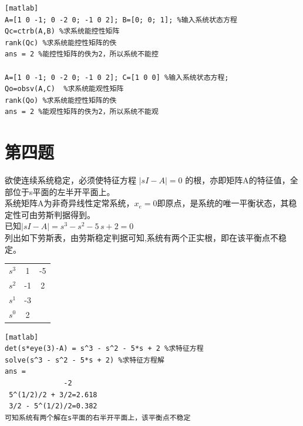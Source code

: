 \documentclass[a4paper]{article}
\begin{document}
\begin{verbatim}[matlab]
A=[1 0 -1; 0 -2 0; -1 0 2]; B=[0; 0; 1]; %输入系统状态方程
Qc=ctrb(A,B) %求系统能控性矩阵
rank(Qc) %求系统能控性矩阵的佚
ans = 2 %能控性矩阵的佚为2，所以系统不能控
 
A=[1 0 -1; 0 -2 0; -1 0 2]; C=[1 0 0] %输入系统状态方程;   
Qo=obsv(A,C)  %求系统能观性矩阵
rank(Qo) %求系统能控性矩阵的佚
ans = 2 %能观性矩阵的佚为2，所以系统不能观
\end{verbatim}
\section*{第四题}
欲使连续系统稳定，必须使特征方程 $|sI-A|=0$ 的根，亦即矩阵A的特征值，全部位于s平面的左半开平面上。\\
系统矩阵A为非奇异线性定常系统，$x_{e}=0$即原点，是系统的唯一平衡状态，其稳定性可由劳斯判据得到。\\
已知$|sI-A|=s^3 - s^2 - 5\, s + 2 =0 $ \\
列出如下劳斯表，由劳斯稳定判据可知,系统有两个正实根，即在该平衡点不稳定。
\begin{table}[!h]
\centering
\begin{tabular}{c  c  c}  
$s^{3}$ & 1 & -5 \\ 
$s^{2}$ & -1 & 2 \\ 
$s^{1}$ & -3 & \\ 
$s^{0}$ & 2 & 
\end{tabular}
\end{table}

\begin{verbatim}[matlab] 
det(s*eye(3)-A) = s^3 - s^2 - 5*s + 2 %求特征方程
solve(s^3 - s^2 - 5*s + 2) %求特征方程解 
ans =
              -2
 5^(1/2)/2 + 3/2=2.618
 3/2 - 5^(1/2)/2=0.382
可知系统有两个解在s平面的右半开平面上，该平衡点不稳定
\end{verbatim}
\end{document}
